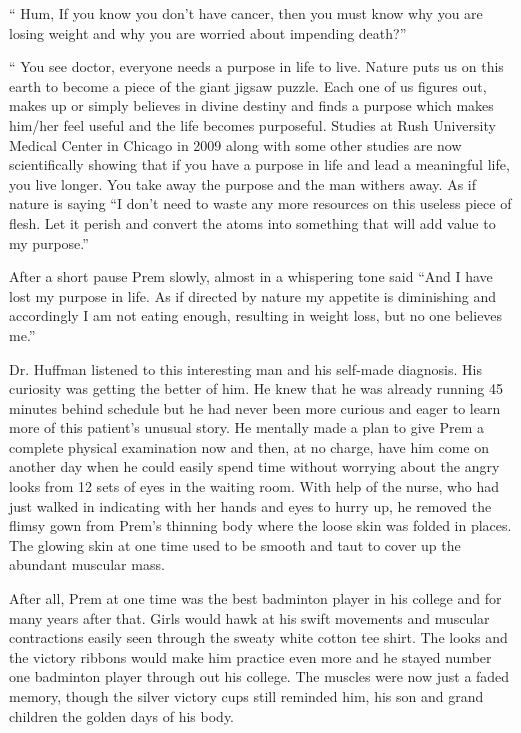 `` Hum, If you know you don't have cancer, then you must know why you
are losing weight and why you are worried about impending death?''

`` You see doctor, everyone needs a purpose in life to live. Nature puts
us on this earth to become a piece of the giant jigsaw puzzle. Each one
of us figures out, makes up or simply believes in divine destiny and
finds a purpose which makes him/her feel useful and the life becomes
purposeful. Studies at Rush University Medical Center in Chicago in 2009
along with some other studies are now scientifically showing that if you
have a purpose in life and lead a meaningful life, you live longer. You
take away the purpose and the man withers away. As if nature is saying
``I don't need to waste any more resources on this useless piece of
flesh. Let it perish and convert the atoms into something that will add
value to my purpose.''

After a short pause Prem slowly, almost in a whispering tone said ``And
I have lost my purpose in life. As if directed by nature my appetite is
diminishing and accordingly I am not eating enough, resulting in weight
loss, but no one believes me.''

Dr. Huffman listened to this interesting man and his self-made
diagnosis. His curiosity was getting the better of him. He knew that he
was already running 45 minutes behind schedule but he had never been
more curious and eager to learn more of this patient's unusual story. He
mentally made a plan to give Prem a complete physical examination now
and then, at no charge, have him come on another day when he could
easily spend time without worrying about the angry looks from 12 sets of
eyes in the waiting room. With help of the nurse, who had just walked in
indicating with her hands and eyes to hurry up, he removed the flimsy
gown from Prem's thinning body where the loose skin was folded in
places. The glowing skin at one time used to be smooth and taut to cover
up the abundant muscular mass.

After all, Prem at one time was the best badminton player in his college
and for many years after that. Girls would hawk at his swift movements
and muscular contractions easily seen through the sweaty white cotton
tee shirt. The looks and the victory ribbons would make him practice
even more and he stayed number one badminton player through out his
college. The muscles were now just a faded memory, though the silver
victory cups still reminded him, his son and grand children the golden
days of his body.

